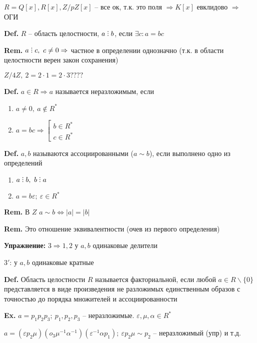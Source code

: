 \documentclass[14pt, letter paper]{article}
\def\divby{%
  \mathrel{\text{\vbox{\baselineskip.65ex\lineskiplimit0pt\hbox{.}\hbox{.}\hbox{.}}}}%
}
\begin{document}
$R = Q[x], R[x], Z/pZ[x]$ -- все ок, т.к. это поля $\Rightarrow K[x]$ евклидово $\Rightarrow$ ОГИ

\vspace{5mm}

\textbf{Def.} $R$ -- область целостности, $a \divby b$, если $\exists c : a = bc$

\textbf{Rem.} $a \divby c,\ c \neq 0 \Rightarrow$ частное в определении однозначно (т.к. в области целостности верен закон сохранения)

$Z/4Z,\ 2 = 2 \cdot 1 = 2 \cdot 3 ????$

\textbf{Def.} $a \in R \Rightarrow a$ называется неразложимым, если 

\begin{enumerate}
    \item $a \neq 0,\ a \not \in R^*$
    \item $a = bc \Rightarrow \left[ \begin{gathered}
        b \in R^* \\
        c \in R^*
    \end{gathered} \right.$
\end{enumerate}

\textbf{Def.} $a, b$ называются ассоциированными ($a \sim b$), если выполнено одно из определений

\begin{enumerate}
    \item $a \divby b,\ b \divby a$
    \item $a = b\varepsilon;\ \varepsilon \in R^*$
\end{enumerate}

\textbf{Rem.} В $Z$ $a \sim b \Leftrightarrow |a| = |b|$

\textbf{Rem.} Это отношение эквивалентности (очев из первого определения)

\textbf{Упражнение:} $3 \Rightarrow 1, 2$ у $a, b$ одинаковые делители

$3'$: у $a, b$ одинаковые кратные

\vspace{5mm}

\textbf{Def.} Область целостности $R$ называется факториальной, если любой $a \in R\backslash\{0\}$ представляется в виде произведения не разложимых единственным образов с точностью до порядка множителей и ассоциированности

\textbf{Ex.} $a = p_1p_2p_3;\ p_1,p_2,p_3$ -- неразложимые. $\varepsilon, \mu, \alpha \in R^*$

$a = (\varepsilon p_2 \mu)(o_3 \mu^{-1} \alpha^{-1})(\varepsilon^{-1} \alpha p_1);\ \varepsilon p_2 \mu \sim p_2$ -- неразложимый (упр) и т.д.
\end{document}
